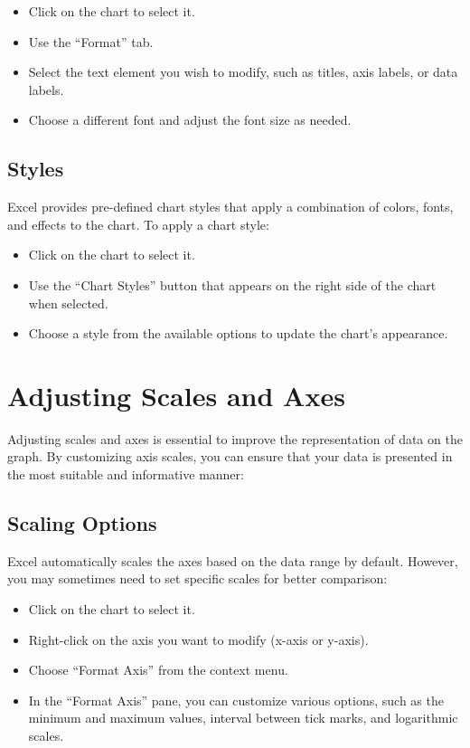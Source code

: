 \documentclass[
]{book}
\providecommand{\tightlist}{%
  \setlength{\itemsep}{0pt}\setlength{\parskip}{0pt}}
\begin{document}
\begin{itemize}
\tightlist
\item
  Click on the chart to select it.
\item
  Use the ``Format'' tab.
\item
  Select the text element you wish to modify, such as titles, axis labels, or data labels.
\item
  Choose a different font and adjust the font size as needed.
\end{itemize}

\hypertarget{styles}{%
\subsection{Styles}\label{styles}}

Excel provides pre-defined chart styles that apply a combination of colors, fonts, and effects to the chart. To apply a chart style:

\begin{itemize}
\tightlist
\item
  Click on the chart to select it.
\item
  Use the ``Chart Styles'' button that appears on the right side of the chart when selected.
\item
  Choose a style from the available options to update the chart's appearance.
\end{itemize}

\hypertarget{adjusting-scales-and-axes}{%
\section{Adjusting Scales and Axes}\label{adjusting-scales-and-axes}}

Adjusting scales and axes is essential to improve the representation of data on the graph. By customizing axis scales, you can ensure that your data is presented in the most suitable and informative manner:

\hypertarget{scaling-options}{%
\subsection{Scaling Options}\label{scaling-options}}

Excel automatically scales the axes based on the data range by default. However, you may sometimes need to set specific scales for better comparison:

\begin{itemize}
\tightlist
\item
  Click on the chart to select it.
\item
  Right-click on the axis you want to modify (x-axis or y-axis).
\item
  Choose ``Format Axis'' from the context menu.
\item
  In the ``Format Axis'' pane, you can customize various options, such as the minimum and maximum values, interval between tick marks, and logarithmic scales.
\end{itemize}
\end{document}
